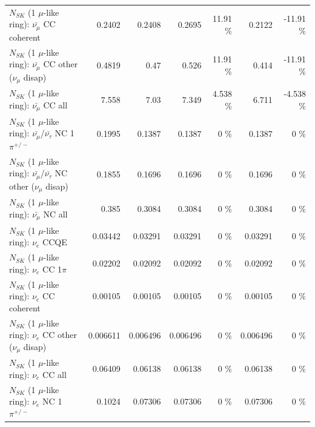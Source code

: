 \begin{table}
\begin{tabular}{| l | r | r | r  r | r  r |}
                       $N_{SK}$ (1 $\mu$-like ring): $\bar{\nu_\mu}$ CC coherent &          0.2402 &          0.2408 &          0.2695 &    11.91 \%  &          0.2122 &   -11.91 \%  \\ 
        $N_{SK}$ (1 $\mu$-like ring): $\bar{\nu_\mu}$ CC other ($\nu_\mu$ disap) &          0.4819 &            0.47 &           0.526 &    11.91 \%  &           0.414 &   -11.91 \%  \\ 
                          $N_{SK}$ (1 $\mu$-like ring): $\bar{\nu_{\mu}}$ CC all &           7.558 &            7.03 &           7.349 &    4.538 \%  &           6.711 &   -4.538 \%  \\ 
\hline
  $N_{SK}$ (1 $\mu$-like ring): $\bar{\nu_\mu}$/$\bar{\nu_\tau}$ NC 1$\pi^{+/-}$ &          0.1995 &          0.1387 &          0.1387 &        0 \%  &          0.1387 &        0 \%  \\ 
$N_{SK}$ (1 $\mu$-like ring): $\bar{\nu_\mu}$/$\bar{\nu_\tau}$ NC other ($\nu_\mu$ disap) &          0.1855 &          0.1696 &          0.1696 &        0 \%  &          0.1696 &        0 \%  \\ 
                          $N_{SK}$ (1 $\mu$-like ring): $\bar{\nu_{\mu}}$ NC all &           0.385 &          0.3084 &          0.3084 &        0 \%  &          0.3084 &        0 \%  \\ 
\hline
\hline
\hline
                                      $N_{SK}$ (1 $\mu$-like ring): $\nu_e$ CCQE &         0.03442 &         0.03291 &         0.03291 &        0 \%  &         0.03291 &        0 \%  \\ 
                                 $N_{SK}$ (1 $\mu$-like ring): $\nu_e$ CC 1$\pi$ &         0.02202 &         0.02092 &         0.02092 &        0 \%  &         0.02092 &        0 \%  \\ 
                               $N_{SK}$ (1 $\mu$-like ring): $\nu_e$ CC coherent &         0.00105 &         0.00105 &         0.00105 &        0 \%  &         0.00105 &        0 \%  \\ 
                $N_{SK}$ (1 $\mu$-like ring): $\nu_e$ CC other ($\nu_\mu$ disap) &        0.006611 &        0.006496 &        0.006496 &        0 \%  &        0.006496 &        0 \%  \\ 
                                  $N_{SK}$ (1 $\mu$-like ring): $\nu_{e}$ CC all &         0.06409 &         0.06138 &         0.06138 &        0 \%  &         0.06138 &        0 \%  \\ 
\hline
                           $N_{SK}$ (1 $\mu$-like ring): $\nu_e$ NC 1$\pi^{+/-}$ &          0.1024 &         0.07306 &         0.07306 &        0 \%  &         0.07306 &        0 \%  \\ 

\end{tabular}
\end{table}
